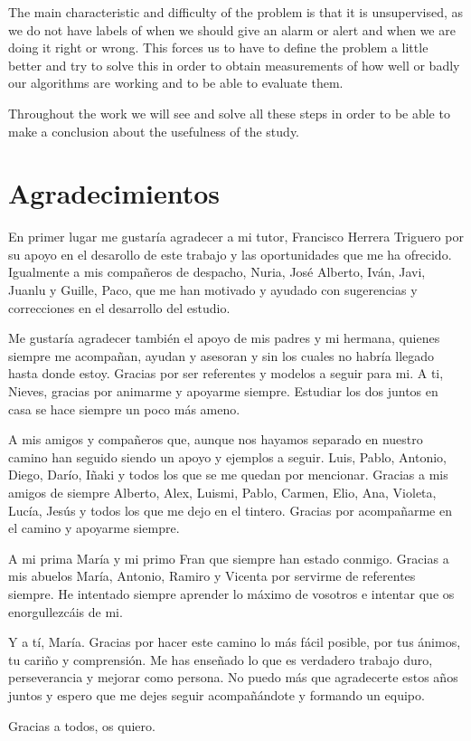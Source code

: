 The main characteristic and difficulty of the problem is that it is unsupervised, as we do not have labels of when we should give an alarm or alert and when we are doing it right or wrong. This forces us to have to define the problem a little better and try to solve this in order to obtain measurements of how well or badly our algorithms are working and to be able to evaluate them.

Throughout the work we will see and solve all these steps in order to be able to make a conclusion about the usefulness of the study.

\chapter*{Agradecimientos}
\thispagestyle{empty}

En primer lugar me gustaría agradecer a mi tutor, Francisco Herrera Triguero por su apoyo en el desarollo de este trabajo y las oportunidades que me ha ofrecido. Igualmente a mis compañeros de despacho, Nuria, José Alberto, Iván, Javi, Juanlu y Guille, Paco, que me han motivado y ayudado con sugerencias y correcciones en el desarrollo del estudio.

Me gustaría agradecer también el apoyo de mis padres y mi hermana, quienes siempre me acompañan, ayudan y asesoran y sin los cuales no habría llegado hasta donde estoy. Gracias por ser referentes y modelos a seguir para mi. A ti, Nieves, gracias por animarme y apoyarme siempre. Estudiar los dos juntos en casa se hace siempre un poco más ameno.

A mis amigos y compañeros que, aunque nos hayamos separado en nuestro camino han seguido siendo un apoyo y ejemplos a seguir. Luis, Pablo, Antonio, Diego, Darío, Iñaki y todos los que se me quedan por mencionar. Gracias a mis amigos de siempre Alberto, Alex, Luismi, Pablo, Carmen, Elio, Ana, Violeta, Lucía, Jesús y todos los que me dejo en el tintero. Gracias por acompañarme en el camino y apoyarme siempre.

A mi prima María y mi primo Fran que siempre han estado conmigo. Gracias a mis abuelos María, Antonio, Ramiro y Vicenta por servirme de referentes siempre. He intentado siempre aprender lo máximo de vosotros e intentar que os enorgullezcáis de mi.

Y a tí, María. Gracias por hacer este camino lo más fácil posible, por tus ánimos, tu cariño y comprensión. Me has enseñado lo que es verdadero trabajo duro, perseverancia y mejorar como persona. No puedo más que agradecerte estos años juntos y espero que me dejes seguir acompañándote y formando un equipo.

Gracias a todos, os quiero.